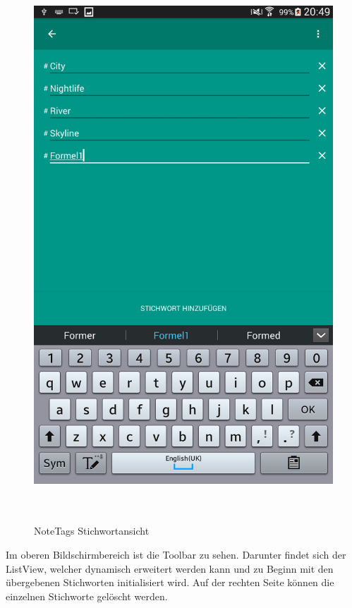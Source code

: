 \begin{figure}[H]
\centering
\begin{minipage}[t]{1\textwidth} %
\caption{NoteTags Stichwortansicht} %
\includegraphics[height=20cm]{img/note_tagOverview}\\ %
\end{minipage}
\end{figure}

Im oberen Bildschirmbereich ist die Toolbar zu sehen. Darunter findet sich der ListView, welcher dynamisch erweitert werden kann und zu Beginn mit den übergebenen Stichworten initialisiert wird. Auf der rechten Seite können die einzelnen Stichworte gelöscht werden.

